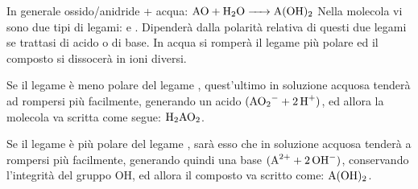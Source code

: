 In generale ossido/anidride + acqua:
\(\ce{AO + H_2O -> A(OH)_2}\)
Nella molecola vi sono due tipi di legami:  e . Dipenderà dalla polarità relativa di questi due legami se trattasi di acido o di base. In acqua si romperà il legame più polare ed il composto si dissocerà in ioni diversi.

Se il legame  è meno polare del legame , quest'ultimo in soluzione acquosa tenderà ad rompersi più facilmente, generando un acido \(\ce{(AO_2- + 2H+)}\), ed allora la molecola va scritta come segue: \(\ce{H_2AO_2}\).

Se il legame  è più polare del legame , sarà esso che in soluzione acquosa tenderà a rompersi più facilmente, generando quindi una base \(\ce{(A^{2+} + 2OH^-)}\), conservando l’integrità del gruppo OH, ed allora il composto va scritto come: $\rm A(OH)_2$.
